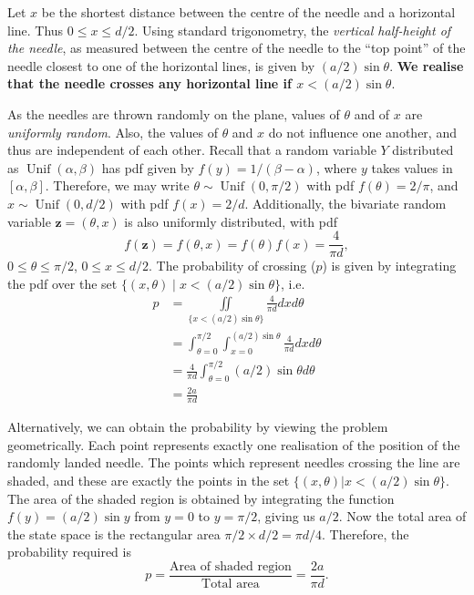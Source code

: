 \documentclass[11pt]{article}
\begin{document}
Let \(x\) be the shortest distance between the centre of the needle and a horizontal line. 
Thus \(0\leq x \leq d/2\). 
Using standard trigonometry, the \textit{vertical half-height of the needle}, as measured between the centre of the needle to the ``top point'' of the needle closest to one of the horizontal lines, is given by \((a/2)\sin\theta\).
\textbf{We realise that the needle crosses any horizontal line if $x < (a/2)\sin\theta$}.

As the needles are thrown randomly on the plane, values of \(\theta\) and of \(x\) are \textit{uniformly random}. 
Also, the values of \(\theta\) and \(x\) do not influence one another, and thus are independent of each other. 
Recall that a random variable \(Y\) distributed as \(\operatorname{Unif}(\alpha,\beta)\) has pdf given by \(f(y) = 1/(\beta-\alpha)\), where \(y\) takes values in \([\alpha,\beta]\).
Therefore, we may write \(\theta \sim \operatorname{Unif}(0,\pi/2)\) with pdf \(f(\theta)=2/\pi\), and \(x \sim \operatorname{Unif}(0,d/2)\) with pdf \(f(x)=2/d\). 
Additionally, the bivariate random variable \(\mathbf z = (\theta,x)\) is also uniformly distributed, with pdf 
\[
f(\mathbf z) = f(\theta,x) = f(\theta)f(x) = \frac{4}{\pi d},
\] 
\(0\leq\theta\leq \pi/2\), \(0\leq x \leq d/2\). 
The probability of crossing (\(p\)) is given by integrating the pdf over the set \(\{(x,\theta) \mid x < (a/2)\sin\theta \}\), i.e. 
\begin{align*}
p &= \iint\limits_{\{x < (a/2)\sin\theta\}} \frac{4}{\pi d} d x d\theta \\
&= \int_{\theta=0}^{\pi/2} \int_{x=0}^{(a/2)\sin\theta} \frac{4}{\pi d} d x d \theta \\
&= \frac{4}{\pi d} \int_{\theta=0}^{\pi/2} (a/2)\sin\theta d \theta \\
&= \frac{2a}{\pi d}
\end{align*}

Alternatively, we can obtain the probability by viewing the problem geometrically. 
Each point represents exactly one realisation of the position of the randomly landed needle. 
The points which represent needles crossing the line are shaded, and these are exactly the points in the set \(\{(x,\theta)| x < (a/2)\sin\theta \}\). 
The area of the shaded region is obtained by integrating the function \(f(y) = (a/2)\sin y\) from \(y=0\) to \(y=\pi/2\), giving us \(a/2\).
Now the total area of the state space is the rectangular area \(\pi/2 \times d/2 = \pi d / 4\). 
Therefore, the probability required is
\begin{equation}
p = \frac{\text{Area of shaded region}}{\text{Total area}} = \frac{2a}{\pi d}.
\end{equation}
\end{document}
